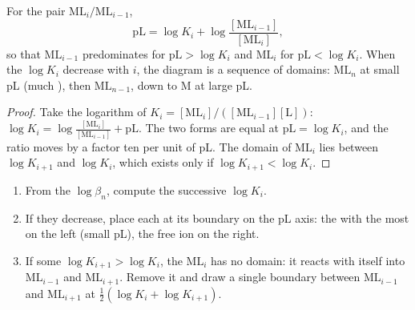 \begin{proposition}[Boundaries in pL]\label{prop:b1:complexation:pl-boundaries}
For the pair $\mathrm{ML}_i/\mathrm{ML}_{i-1}$,
\[
  \mathrm{pL} = \log K_i + \log\frac{[\mathrm{ML}_{i-1}]}{[\mathrm{ML}_i]} ,
\]
so that $\mathrm{ML}_{i-1}$ predominates for $\mathrm{pL} > \log K_i$ and
$\mathrm{ML}_i$ for $\mathrm{pL} < \log K_i$. When the $\log K_i$ decrease
with $i$, the diagram is a sequence of domains: $\mathrm{ML}_n$ at small
pL (much ), then $\mathrm{ML}_{n-1}$, down to M at large pL.
\end{proposition}

\begin{proof}
Take the logarithm of $K_i = [\mathrm{ML}_i]/([\mathrm{ML}_{i-1}][\mathrm{L}])$:
$\log K_i = \log\frac{[\mathrm{ML}_i]}{[\mathrm{ML}_{i-1}]} + \mathrm{pL}$.
The two forms are equal at $\mathrm{pL} = \log K_i$, and the ratio moves
by a factor ten per unit of pL. The domain of $\mathrm{ML}_i$ lies between
$\log K_{i+1}$ and $\log K_i$, which exists only if $\log K_{i+1} < \log
K_i$.
\end{proof}

\begin{method}\label{met:b1:complexation:pl-diagram}
\begin{enumerate}
  \item From the $\log\beta_n$, compute the successive $\log K_i$.
  \item If they decrease, place each at its boundary on the pL axis: the
         with the most  on the left (small pL), the free
        ion on the right.
  \item If some $\log K_{i+1} > \log K_i$, the  $\mathrm{ML}_i$ has
        no domain: it reacts with itself into $\mathrm{ML}_{i-1}$ and
        $\mathrm{ML}_{i+1}$. Remove it and draw a single boundary between
        $\mathrm{ML}_{i-1}$ and $\mathrm{ML}_{i+1}$ at
        $\frac12(\log K_i + \log K_{i+1})$.
\end{enumerate}
\end{method}

